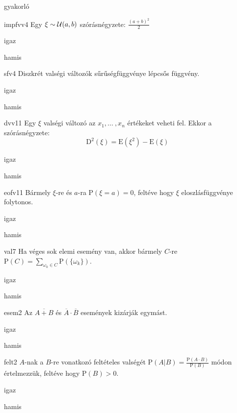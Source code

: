 \documentclass[12pt]{article}
\begin{document}
\begin{quiz}{gyakorló}

\begin{multi}[feedback={wiki}]{impfvv4}
Egy $\xi\sim {\cal U}(a,b)$ szórásnégyzete: $\frac{(a+b)^2}{2}$
\item igaz
\item* hamis
\end{multi}
\begin{multi}[feedback={Diszkrét vv-nak nincs sfv-e}]{sfv4}
Diszkrét valségi változók sűrűségfüggvénye lépcsős függvény.
\item igaz
\item* hamis
\end{multi}
\begin{multi}[feedback={Def./tulajdonság}]{dvv11}
Egy $\xi$ valségi változó az $x_1,{...\:} ,x_n$ értékeket veheti fel. 
Ekkor a szórásnégyzete:
$$
\mathrm{D}^2(\xi)=\mathrm{E}(\xi^2)-\mathrm{E}(\xi)
$$
\item igaz
\item* hamis
\end{multi}
\begin{multi}[feedback={$\mathrm{P}(\xi=a)\le\mathrm{P}(a\le\xi<a+\frac{1}{n})=F(a+\frac{1}{n})-F(a) \overset{n\to\infty}{\to} 0$}]{eofv11}
Bármely $\xi$-re és $a$-ra $\mathrm{P}(\xi= a)=0$, feltéve hogy $\xi$ eloszlásfüggvénye
folytonos.
\item* igaz
\item hamis
\end{multi}
\begin{multi}[feedback={Additívitás.}]{val7}
Ha véges sok elemi esemény van, akkor bármely $C$-re $\mathrm{P}(C)=\sum_{\omega_k\in C} \mathrm{P}( \{\omega_k \})$.
\item* igaz
\item hamis
\end{multi}
\begin{multi}[feedback={de-Morgan azonosság}]{esem2}
Az $\overline{A+B}$ és $\overline{A} \cdot \overline{B}$ események kizárják egymást.
\item igaz
\item* hamis
\end{multi}
\begin{multi}[feedback={Def.}]{felt2}
$A$-nak a $B$-re vonatkozó feltételes valségét $\mathrm{P}(A|B)=\frac{\mathrm{P}(A\cdot B)}{\mathrm{P}(B)}$ módon értelmezzük, feltéve hogy $\mathrm{P}(B)>0$.
\item* igaz
\item hamis
\end{multi}

\end{quiz}
\end{document}
